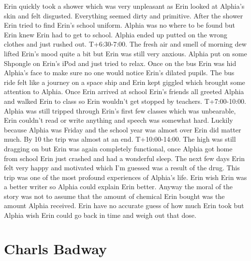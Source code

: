 \documentclass[12pt]{book}
\begin{document}
Erin quickly took a shower which was very unpleasant as Erin looked at Alphia's skin and felt disgusted. Everything seemed dirty and primitive. After the shower Erin tried to find Erin's school uniform. Alphia was no where to be found but Erin knew Erin had to get to school. Alphia ended up putted on the wrong clothes and just rushed out. T+6:30-7:00. The fresh air and smell of morning dew lifted Erin's mood quite a bit but Erin was still very anxious. Alphia put on some Shpongle on Erin's iPod and just tried to relax. Once on the bus Erin was hid Alphia's face to make sure no one would notice Erin's dilated pupils. The bus ride felt like a journey on a space ship and Erin kept giggled which brought some attention to Alphia. Once Erin arrived at school Erin's friends all greeted Alphia and walked Erin to class so Erin wouldn't get stopped by teachers. T+7:00-10:00. Alphia was still tripped through Erin's first few classes which was unbearable, Erin couldn't read or write anything and speech was somewhat hard. Luckily because Alphia was Friday and the school year was almost over Erin did matter much. By 10 the trip was almost at an end. T+10:00-14:00. The high was still dragging on but Erin was again completely functional, once Alphia got home from school Erin just crashed and had a wonderful sleep. The next few days Erin felt very happy and motivated which I'm guessed was a result of the drug. This trip was one of the most profound experiences of Alphia's life. Erin wish Erin was a better writer so Alphia could explain Erin better. Anyway the moral of the story was not to assume that the amount of chemical Erin bought was the amount Alphia received. Erin have no accurate guess of how much Erin took but Alphia wish Erin could go back in time and weigh out that dose.



\chapter{Charls Badway}
\end{document}
